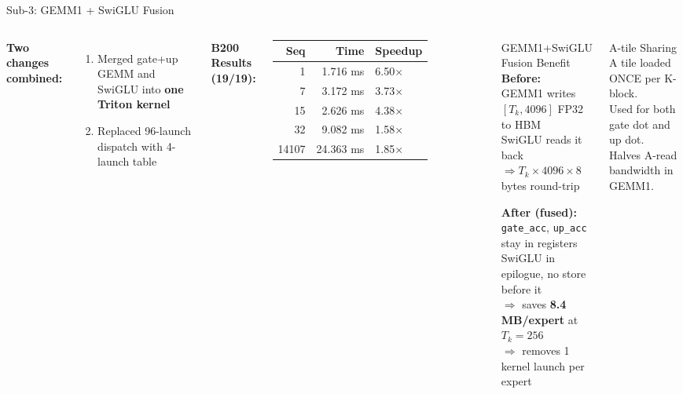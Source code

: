 \begin{frame}{Sub-3: GEMM1 + SwiGLU Fusion}
\begin{columns}[T]
\small\textbf{Two changes combined:}
\begin{enumerate}\small
  \item Merged gate+up GEMM and SwiGLU into \textbf{one Triton kernel}
  \item Replaced 96-launch dispatch with 4-launch table
\end{enumerate}

\medskip\textbf{B200 Results (19/19):}
\scriptsize\begin{tabular}{rrl}
\toprule
Seq & Time & Speedup \\ \midrule
1     & 1.716 ms  & 6.50$\times$ \\
7     & 3.172 ms  & 3.73$\times$ \\
15    & 2.626 ms  & 4.38$\times$ \\
32    & 9.082 ms  & 1.58$\times$ \\
14107 & 24.363 ms & 1.85$\times$ \\
\bottomrule
\end{tabular}

\begin{block}{\small GEMM1+SwiGLU Fusion Benefit}
\scriptsize
\textbf{Before:}\\
GEMM1 writes $[T_k, 4096]$ FP32 to HBM\\
SwiGLU reads it back\\
$\Rightarrow T_k \times 4096 \times 8$ bytes round-trip

\medskip
\textbf{After (fused):}\\
\texttt{gate\_acc}, \texttt{up\_acc} stay in registers\\
SwiGLU in epilogue, no store before it\\
$\Rightarrow$ saves \textbf{8.4 MB/expert} at $T_k=256$\\
$\Rightarrow$ removes 1 kernel launch per expert
\end{block}

\begin{exampleblock}{\small A-tile Sharing}
\scriptsize
A tile loaded ONCE per K-block.\\
Used for both gate dot and up dot.\\
Halves A-read bandwidth in GEMM1.
\end{exampleblock}
\end{columns}
\end{frame}

